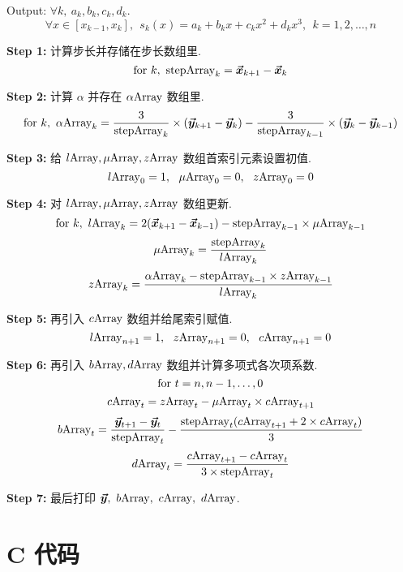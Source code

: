 \documentclass[oneside,UTF8]{article}
\numberwithin{figure}{section}
\numberwithin{table}{section}
\numberwithin{equation}{section}
\begin{document}
Output: $\forall k,\ a_k,b_k,c_k,d_k$.
\[ \forall x\in[x_{k-1},x_k],\ \ s_k(x)=a_k+b_kx+c_kx^2+d_kx^3,\ \ k=1,2,\ldots,n \]

\textbf{Step 1:} 计算步长并存储在步长数组里.
\[ {\rm for}\ k,\ {\rm stepArray}_{k}=\bm{\vec{x}}_{k+1}-\bm{\vec{x}}_{k} \]


\textbf{Step 2:} 计算 $\alpha$ 并存在 $\alpha{\rm Array}$ 数组里.
\[ {\rm for}\ k,\ \alpha{\rm Array}_{k}=\dfrac{3}{{\rm stepArray}_k}\times(\bm{\vec{y}}_{k+1}-\bm{\vec{y}}_k)-\dfrac{3}{{\rm stepArray}_{k-1}}\times(\bm{\vec{y}}_{k}-\bm{\vec{y}}_{k-1}) \]

\textbf{Step 3:} 给 $l{\rm Array},\mu{\rm Array},z{\rm Array}$ 数组首索引元素设置初值.
\[ l{\rm Array}_0=1,\ \ \mu{\rm Array}_0=0,\ \ z{\rm Array}_0=0 \]

\textbf{Step 4:} 对 $l{\rm Array},\mu{\rm Array},z{\rm Array}$ 数组更新.
\[ {\rm for}\ k,\ l{\rm Array}_k=2(\bm{\vec{x}}_{k+1}-\bm{\vec{x}}_{k-1})-{\rm stepArray}_{k-1}\times\mu{\rm Array}_{k-1} \]
\[ \mu{\rm Array}_k=\dfrac{{\rm stepArray}_k}{l{\rm Array}_k} \]
\[ z{\rm Array}_k=\dfrac{\alpha{\rm Array}_{k}-{\rm stepArray}_{k-1}\times z{\rm Array}_{k-1}}{l{\rm Array}_k} \]

\textbf{Step 5:} 再引入 $c{\rm Array}$ 数组并给尾索引赋值.
\[ l{\rm Array}_{n+1}=1,\ \ z{\rm Array}_{n+1}=0,\ \ c{\rm Array}_{n+1}=0 \]

\textbf{Step 6:} 再引入 $b{\rm Array},d{\rm Array}$ 数组并计算多项式各次项系数.
\[ {\rm for}\ t=n,n-1,\ldots,0 \]
\[ c{\rm Array}_{t}=z{\rm Array}_t-\mu{\rm Array}_t\times c{\rm Array}_{t+1} \]
\[ b{\rm Array}_t=\dfrac{\bm{\vec{y}}_{t+1}-\bm{\vec{y}}_{t}}{{\rm stepArray}_t}-\dfrac{{\rm stepArray}_t(c{\rm Array}_{t+1}+2\times c{\rm Array}_t)}{3} \]
\[ d{\rm Array}_t=\dfrac{c{\rm Array}_{t+1}-c{\rm Array}_t}{3\times {\rm stepArray}_t} \]

\textbf{Step 7:} 最后打印 $\bm{\vec{y}},\ b{\rm Array},\ c{\rm Array},\ d{\rm Array}$.






\section{\songti C 代码}
\end{document}
